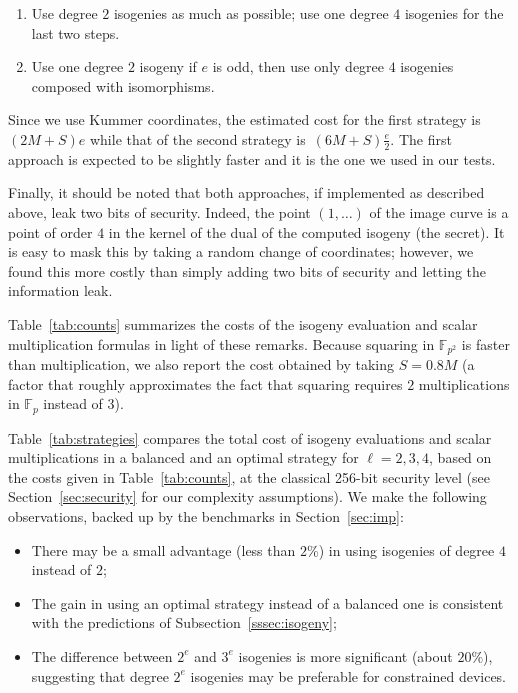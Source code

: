 \documentclass[jmc]{degruyter-journal-a}
\theoremstyle{definition}
\newcommand{\FF}{{\mathbb{F}}}
\begin{document}
\begin{enumerate}
\item Use degree $2$ isogenies as much as possible; use one degree $4$
  isogenies for the last two steps.
\item Use one degree $2$ isogeny if $e$ is odd, then use only degree
  $4$ isogenies composed with isomorphisms.
\end{enumerate}

Since we use Kummer coordinates, the estimated cost for the first
strategy is~$(2M + S)e$ while that of the second strategy is~$(6M+S)
\frac{e}{2}$. The first approach is expected to be slightly faster and
it is the one we used in our tests.

Finally, it should be noted that both approaches, if implemented as
described above, leak two bits of security. Indeed, the point
$(1,\ldots)$ of the image curve is a point of order $4$ in the kernel
of the dual of the computed isogeny (the secret). It is easy to mask
this by taking a random change of coordinates; however, we found this
more costly than simply adding two bits of security and letting the
information leak.

Table~\ref{tab:counts} summarizes the costs of the isogeny evaluation
and scalar multiplication formulas in light of these remarks. Because
squaring in $\FF_{p^2}$ is faster than multiplication, we also report
the cost obtained by taking $S=0.8M$ (a factor that roughly
approximates the fact that squaring requires $2$ multiplications in
$\FF_p$ instead of $3$).

Table~\ref{tab:strategies} compares the total cost of isogeny
evaluations and scalar multiplications in a balanced and an optimal
strategy for $\ell=2,3,4$, based on the costs given in
Table~\ref{tab:counts}, at the classical 256-bit security level (see
Section~\ref{sec:security} for our complexity assumptions). We make the following observations, backed up by the benchmarks in Section~\ref{sec:imp}:
\begin{itemize}
\item There may be a small advantage (less than $2\%$) in using
  isogenies of degree $4$ instead of $2$;
\item The gain in using an optimal strategy instead of a balanced one
  is consistent with the predictions of
  Subsection~\ref{sssec:isogeny};
\item The difference between $2^e$ and $3^e$ isogenies is more
  significant (about $20\%$), suggesting that degree $2^e$ isogenies
  may be preferable for constrained devices.
\end{itemize}
\end{document}
